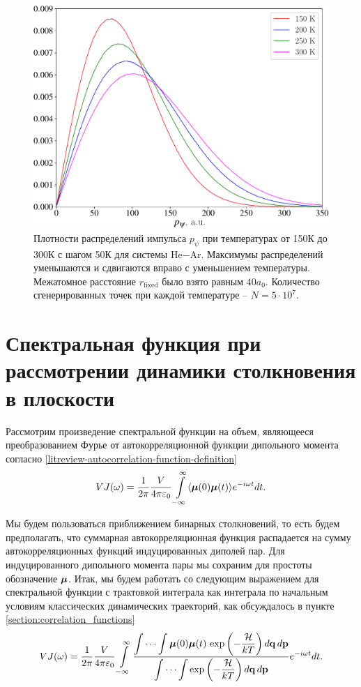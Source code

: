 \begin{figure}[H]
    \centering
    \includegraphics[width=0.75\linewidth]{./pictures/two_atom_distributions/pPsi-crop.pdf}
    \caption{Плотности распределений импульса $p_\psi$ при температурах от 150К до 300К с шагом 50К для системы He$-$Ar. Максимумы распределений уменьшаются и сдвигаются вправо с уменьшением температуры. Межатомное расстояние $r_\text{fixed}$ было взято равным $40a_0$. Количество сгенерированных точек при каждой температуре -- $N = 5 \cdot 10^7$.}
    \label{fig:ppsi-distributions}
\end{figure}

\section{Спектральная функция при рассмотрении динамики столкновения в плоскости} \label{section:spectral_function_in_plane}

Рассмотрим произведение спектральной функции на объем, являющееся преобразованием Фурье от автокорреляционной функции дипольного момента согласно \eqref{litreview-autocorrelation-function-definition}   
\begin{gather}
    VJ(\omega) = \frac{1}{2 \pi} \frac{V}{4 \pi \varepsilon_0} \int\limits_{-\infty}^\infty \langle  \boldsymbol{\mu}(0) \boldsymbol{\mu}(t)  \rangle e^{-i \omega t} dt.
\end{gather}

Мы будем пользоваться приближением бинарных столкновений, то есть будем предполагать, что суммарная автокорреляционная функция распадается на сумму автокорреляционных функций индуцированных диполей пар. Для индуцированного дипольного момента пары мы сохраним для простоты  обозначение $\boldsymbol{\mu}$. Итак, мы будем работать со следующим выражением для спектральной функции с трактовкой интеграла как интеграла по начальным условиям классических динамических траекторий, как обсуждалось в пункте \ref{section:correlation_functions} 
\begin{gather}
    VJ(\omega) = \frac{1}{2\pi} \frac{V}{4 \pi \varepsilon_0} \int\limits_{-\infty}^\infty \frac{\displaystyle \idotsint \boldsymbol{\mu}(0) \boldsymbol{\mu}(t) \, \exp \left( -\frac{\mathcal{H}}{kT} \right) d\mathbf{q} \, d\mathbf{p}}{\displaystyle \idotsint \exp \left( -\frac{\mathcal{H}}{kT} \right) d\mathbf{q} \, d\mathbf{p}} e^{-i \omega t} dt. \label{two-atom-spectral-function1}
\end{gather}

